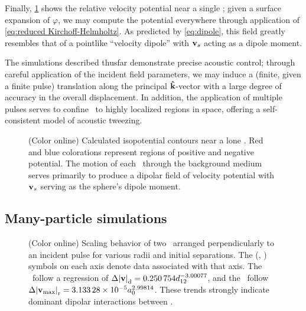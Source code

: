 Finally, \cref{fig:dipole field} shows the relative velocity potential near a single \bubble; given a surface expansion of $\varphi$, we may compute the potential everywhere through application of \cref{eq:reduced Kirchoff-Helmholtz}.
As predicted by \cref{eq:dipole}, this field greatly resembles that of a
pointlike ``velocity dipole'' with $\vb{v}_s$ acting as a dipole moment.

The simulations described thusfar demonstrate precise acoustic control; through careful application of the incident field parameters, we may induce a (finite, given a finite pulse) translation along the principal $\vu{k}$-vector with a large degree of accuracy in the overall displacement.
In addition, the application of multiple pulses serves to confine \bubbles\ to highly localized regions in space, offering a self-consistent model of acoustic tweezing.


\begin{figure}
  \centering
  \caption{
    \label{fig:dipole field}(Color online)
    Calculated isopotential contours near a lone \bubble.
    Red and blue colorations represent regions of positive and negative potential.
    The motion of each \bubble\ through the background medium serves primarily to produce a dipolar field of velocity potential with $\vb{v}_s$ serving as the sphere's dipole moment.
  }
\end{figure}

\subsection{Many-particle simulations}

\begin{figure}
  \centering
  \caption{
    \label{fig:double scaling}(Color online)
    Scaling behavior of two \bubbles\ arranged perpendicularly to an incident pulse for various radii and initial separations.
    The (\redTriangle, \blueCircle) symbols on each axis denote data associated with that axis.
    The \redTriangle\ follow a regression of $\Delta \abs{\vb{v}}_\text{d} = \num{0.250754} d_{12}^{-3.00077}$, and the \blueCircle\ follow $\Delta\abs{\vb{v}_\text{max}}_\text{r} = \num{3.13328e-5} a_0^{2.99814}$.
    These trends strongly indicate dominant dipolar interactions between \bubbles.
  }
\end{figure}

